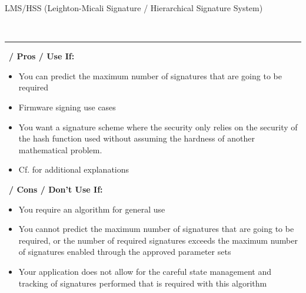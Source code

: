 \begin{algorithmbox}{LMS/HSS (Leighton-Micali Signature / Hierarchical Signature System)}
\begin{minipage}[t]{0.64\textwidth}
    \end{minipage}\\
    \hrule
    \vspace{1\baselineskip}
    \begin{minipage}[t]{0.49\textwidth}
        \scriptsize\faThumbsUp\, {\bfseries / Pros / Use If:}
        \begin{itemize}[leftmargin=*]
            \setlength\itemsep{0em}
            \item You can predict the maximum number of signatures that are going to be required
            \item Firmware signing use cases
            \item You want a signature scheme where the security only relies on the security of the hash function used without assuming the hardness of another mathematical problem.
            \item Cf.  for additional explanations
        \end{itemize}
    \end{minipage}
    \hfill
    \begin{minipage}[t]{0.49\textwidth}
        \scriptsize \faThumbsDown\, {\bfseries / Cons / Don't Use If:}
        \begin{itemize}[leftmargin=*]
            \setlength\itemsep{0em}
            \item You require an algorithm for general use
            \item You cannot predict the maximum number of signatures that are going to be required, or the number of required signatures exceeds the maximum number of signatures enabled through the approved parameter sets
            \item Your application does not allow for the careful state management and tracking of signatures performed that is required with this algorithm
        \end{itemize}
    \end{minipage}
\end{algorithmbox}
